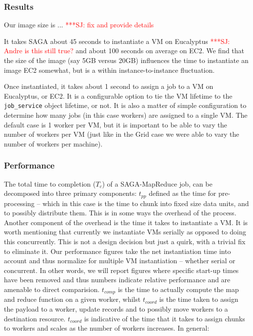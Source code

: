 \documentclass[conference,final]{IEEEtran}
\newcommand{\jhanote}[1]{ {\textcolor{red} { ***SJ: #1 }}}
\newcommand{\jhanote}[1]{}
\newcommand{\sagamapreduce }{SAGA-MapReduce }
\begin{document}
\subsubsection{Results}

Our image size is ... \jhanote{fix and provide details}

It takes SAGA about 45 seconds to instantiate a VM on Eucalyptus
\jhanote{Andre is this still true?}  and about 100 seconds on average
on EC2.  We find that the size of the image (say 5GB versus 20GB)
influences the time to instantiate an image EC2 somewhat, but is a
within instance-to-instance fluctuation.

Once instantiated, it takes about 1 second to assign a job to a VM on
Eucalyptus, or EC2.  It is a configurable option to tie the VM
lifetime to the \texttt{job\_service} object lifetime, or not.  It is
also a matter of simple configuration to determine how many jobs (in
this case workers) are assigned to a single VM. The default case is 1
worker per VM, but it is important to be able to vary the number of
workers per VM (just like in the Grid case we were able to vary the
number of workers per machine). 


\subsubsection{Performance} The total time to completion ($T_c$) of a
\sagamapreduce job, can be decomposed into three primary components:
$t_{pp}$ defined as the time for pre-processing -- which in this case
is the time to chunk into fixed size data units, and to possibly
distribute them. This is in some ways the overhead of the process.
Another component of the overhead is the time it takes to instantiate
a VM. It is worth mentioning that currently we instantiate VMs
serially as opposed to doing this concurrently. This is not a design
decision but just a quirk, with a trivial fix to eliminate it.  Our
performance figures take the net instantiation time into account and
thus normalize for multiple VM instantiation -- whether serial or
concurrent. In other words, we will report figures where specific
start-up times have been removed and thus numbers indicate relative
performance and are amenable to direct comparision.  $t_{comp}$ is the
time to actually compute the map and reduce function on a given
worker, whilst $t_{coord}$ is the time taken to assign the payload to
a worker, update records and to possibly move workers to a destination
resource. $t_{coord}$ is indicative of the time that it takes to
assign chunks to workers and scales as the number of workers
increases. In general:
\end{document}
